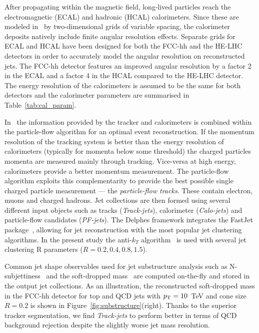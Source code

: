 After propagating within the magnetic field, long-lived particles reach the electromagnetic (ECAL) and hadronic (HCAL) calorimeters. Since these are modeled in \delphes{}~by two-dimensional grids of variable spacing, the calorimeter deposits natively include finite angular resolution effects. Separate grids for ECAL and HCAL have been designed for both the FCC-hh and the HE-LHC detectors in order to accurately model the angular resolution on reconstructed jets. The FCC-hh detector features an improved angular resolution by a factor 2 in the ECAL and a factor 4 in the HCAL compared to the HE-LHC detector. The energy resolution of the calorimeters is assumed to be the same for both detectors and the calorimeter parameters are summarised in Table~\ref{tab:cal_param}.

In \delphes{}~the information provided by the tracker and calorimeters is combined within the particle-flow algorithm for an optimal event reconstruction. If the momentum resolution of the tracking system is better than the energy resolution of calorimeters (typically for momenta below some threshold) the charged particles momenta are measured mainly through tracking. Vice-versa at high energy, calorimeters provide a better momentum measurement. The particle-flow algorithm exploits this complementarity to provide the best possible single charged particle measurement --- the \emph{particle-flow tracks}. These contain electron, muons and charged hadrons. Jet collections are then formed using several different input objects such as tracks (\emph{Track-jets}), calorimeter (\emph{Calo-jets}) and particle-flow candidates (\emph{PF-jets}). The Delphes framework integrates the FastJet package~\cite{Cacciari:2011ma}, allowing for jet reconstruction with the most popular jet clustering algorithms. In the present study the anti-$k_T$ algorithm~\cite{Cacciari:2008gp} is used with several jet clustering R parameters ($R=0.2, 0.4, 0.8, 1.5$).

Common jet shape observables used for jet substructure analysis such as N-subjettiness~\cite{Thaler:2010tr} and the soft-dropped mass~\cite{Larkoski:2014wba} are computed on-the-fly and stored in the output jet collections. As an illustration, the reconstructed soft-dropped mass in the FCC-hh detector for top and QCD jets with $p_{\text{T}}=10$~TeV and cone size $R=0.2$ is shown in Figure~\ref{fig:substructure}(right). Thanks to the superior tracker segmentation, we find \emph{Track-jets} to perform better in terms of QCD background rejection despite the slightly worse jet mass resolution.

